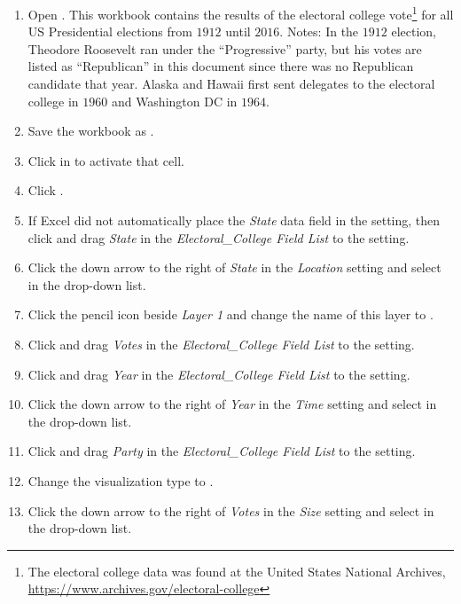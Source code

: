 \begin{enumbox}
	\begin{enumerate}
		\item Open . This workbook contains the results of the electoral college vote\footnote{The electoral college data was found at the United States National Archives, \url{https://www.archives.gov/electoral-college}} for all US Presidential elections from $ 1912 $ until $ 2016 $. Notes: In the $ 1912 $ election, Theodore Roosevelt ran under the ``Progressive'' party, but his votes are listed as ``Republican'' in this document since there was no Republican candidate that year. Alaska and Hawaii first sent delegates to the electoral college in $ 1960 $ and Washington DC in $ 1964 $.
		\item Save the workbook as .
		\item Click in  to activate that cell.
		\item Click .
		\item If Excel did not automatically place the \textit{State} data field in the  setting, then click and drag \textit{State} in the \textit{Electoral\_College Field List} to the  setting. 
		\item Click the down arrow to the right of \textit{State} in the \textit{Location} setting and select  in the drop-down list.
		\item Click the pencil icon beside \textit{Layer 1} and change the name of this layer to .
		\item Click and drag \textit{Votes} in the \textit{Electoral\_College Field List} to the  setting.
		\item Click and drag \textit{Year} in the \textit{Electoral\_College Field List} to the  setting.
		\item Click the down arrow to the right of \textit{Year} in the \textit{Time} setting and select  in the drop-down list.
		\item Click and drag \textit{Party} in the \textit{Electoral\_College Field List} to the  setting.
		\item Change the visualization type to .
		\item Click the down arrow to the right of \textit{Votes} in the \textit{Size} setting and select  in the drop-down list.

\end{enumerate}
\end{enumbox}
